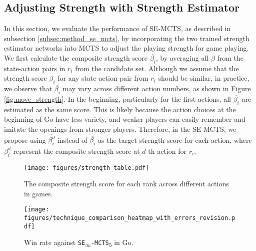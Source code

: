 \subsection{Adjusting Strength with Strength Estimator}
\label{subsec:exp_se_mcts}
In this section, we evaluate the performance of SE-MCTS, as described in subsection \ref{subsec:method_se_mcts}, by incorporating the two trained strength estimator networks into MCTS to adjust the playing strength for game playing.
We first calculate the composite strength score $\overline{\beta_i}$, by averaging all $\beta$ from the state-action pairs in $r_i$ from the candidate set.
Although we assume that the strength score $\beta_i$ for any state-action pair from $r_i$ should be similar, in practice, we observe that $\overline{\beta_i}$ may vary across different action numbers, as shown in Figure \ref{fig:move_strength}.
In the beginning, particularly for the first actions, all $\overline{\beta_i}$ are estimated as the same score.
This is likely because the action choices at the beginning of Go have less variety, and weaker players can easily remember and imitate the openings from stronger players.
Therefore, in the SE-MCTS, we propose using $\overline{\beta_i^d}$ instead of $\overline{\beta_i}$ as the target strength score for each action, where $\overline{\beta_i^d}$ represent the composite strength score at $d$-th action for $r_i$.





\begin{figure}[ht]
\centering
\begin{minipage}{0.55\textwidth}
    \texttt{[image: figures/strength\_table.pdf]}
    \caption{The composite strength score  for each rank across different actions in games.}
    \label{fig:move_strength}
\end{minipage}
\hspace{1em}
\begin{minipage}{0.33\textwidth}
    \texttt{[image: figures/technique\_comparison\_heatmap\_with\_errors\_revision.pdf]}
    \caption{Win rate against \texttt{SE\textsubscript{$\infty$}-MCTS\textsubscript{$5$}} in Go.}
    \label{fig:win_heatmap}
\end{minipage}
\end{figure}

